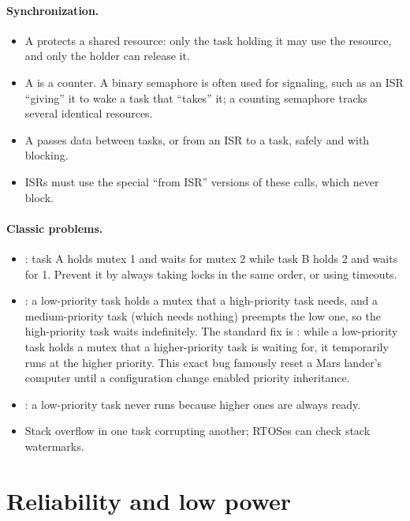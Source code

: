 \paragraph{Synchronization.}
\begin{itemize}
  \item A  protects a shared resource: only the task holding it may use the resource, and only the holder can release it.
  \item A  is a counter. A binary semaphore is often used for signaling, such as an ISR ``giving'' it to wake a task that ``takes'' it; a counting semaphore tracks several identical resources.
  \item A  passes data between tasks, or from an ISR to a task, safely and with blocking.
  \item ISRs must use the special ``from ISR'' versions of these calls, which never block.
\end{itemize}

\paragraph{Classic problems.}
\begin{itemize}
  \item {}: task A holds mutex 1 and waits for mutex 2 while task B holds 2 and waits for 1. Prevent it by always taking locks in the same order, or using timeouts.
  \item {}: a low-priority task holds a mutex that a high-priority task needs, and a medium-priority task (which needs nothing) preempts the low one, so the high-priority task waits indefinitely. The standard fix is : while a low-priority task holds a mutex that a higher-priority task is waiting for, it temporarily runs at the higher priority. This exact bug famously reset a Mars lander's computer until a configuration change enabled priority inheritance.
  \item {}: a low-priority task never runs because higher ones are always ready.
  \item Stack overflow in one task corrupting another; RTOSes can check stack watermarks.
\end{itemize}

\section{Reliability and low power}


